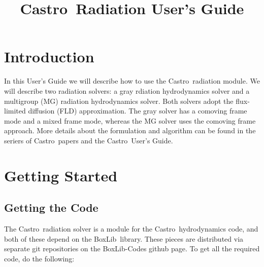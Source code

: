 \documentclass[11pt,letterpaper]{article}
\newcommand{\castro}{{\sf Castro}}
\newcommand{\boxlib}{{\sf BoxLib}}
\begin{document}
\title{\castro\ Radiation User's Guide}
\maketitle

\section{Introduction}

In this User's Guide we will describe how to use the \castro\ radiation
module.  We will describe two radiation solvers: a gray rdiation
hydrodynamics solver and a multigroup (MG) radiation hydrodynamics
solver.  Both solvers adopt the flux-limited diffusion (FLD)
approximation.  The gray solver has a comoving frame mode and a mixed
frame mode, whereas the MG solver uses the comoving frame approach.
More details about the formulation and algorithm can be found in the
seriers of \castro\ papers and the \castro\ User's Guide.

\section{Getting Started}

\subsection{Getting the Code}

The \castro\ radiation solver is a module for the
\castro\ hydrodynamics code, and both of these depend on the
\boxlib\ library.  These pieces are distributed via separate git
repositories on the BoxLib-Codes github page.  To get all the required
code, do the following:
\end{document}
